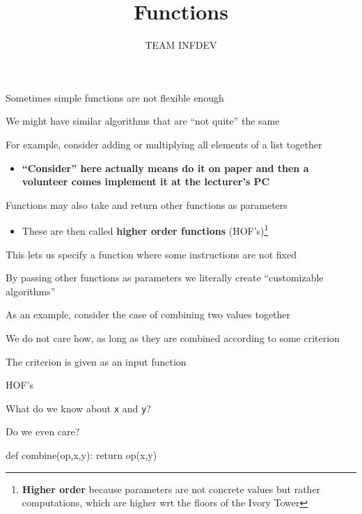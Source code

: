 \documentclass{beamer}
\title{Functions}
\author{TEAM INFDEV}
\institute{Hogeschool Rotterdam \\ 
Rotterdam, Netherlands}
\date{}
\begin{document}
\maketitle

\begin{slide}{
\item Sometimes simple functions are not flexible enough
\item We might have similar algorithms that are ``not quite'' the same
\item For example, consider adding or multiplying all elements of a list together
\begin{itemize}
\item \textbf{``Consider'' here actually means do it on paper and then a volunteer comes implement it at the lecturer's PC}
\end{itemize}
}\end{slide}

\begin{slide}{
\item Functions may also take and return other functions as parameters
\begin{itemize}
\item These are then called \textbf{higher order functions} (HOF's)\footnote{\pause \textbf{Higher order} because parameters are not concrete values but rather computations, which are higher wrt the floors of the Ivory Tower}
\end{itemize}
\item This lets us specify a function where some instructions are not fixed
\item By passing other functions as parameters we literally create ``customizable algorithms''
}\end{slide}

\begin{slide}{
\item As an example, consider the case of combining two values together
\item We do not care how, as long as they are combined according to some criterion
\item The criterion is given as an input function
}\end{slide}

\begin{frame}[fragile]{HOF's}
\begin{codewithblock}{\item What do we know about \texttt{x} and \texttt{y}? \item Do we even care?}
def combine(op,x,y):
  return op(x,y)
\end{codewithblock}
\end{frame}
\end{document}

